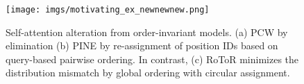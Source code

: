 \begin{figure}[!t]

\centering
\texttt{[image: imgs/motivating\_ex\_newnewnew.png]}
\caption{Self-attention alteration from  order-invariant models.
(a) PCW by elimination (b)
PINE by
re-assignment of position IDs 
based on
query-based pairwise ordering. In contrast, (c) RoToR minimizes the distribution mismatch by global ordering with circular assignment.}

\label{fig:intro_example}
\end{figure}

